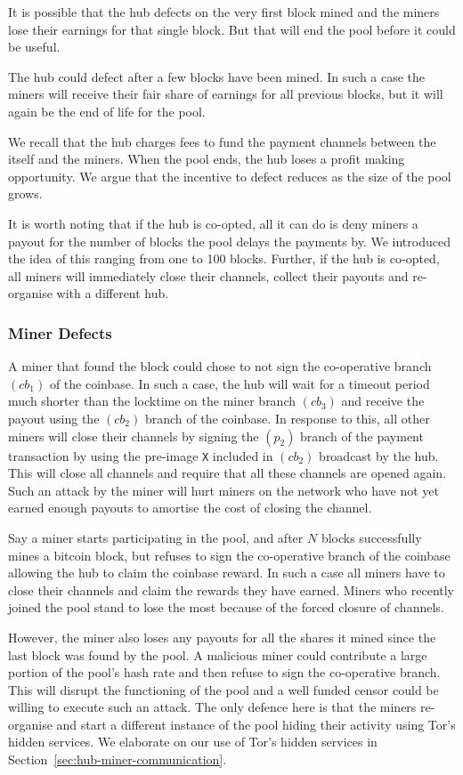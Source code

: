 \documentclass{article}
\begin{document}
It is possible that the hub defects on the very first block mined and
the miners lose their earnings for that single block. But that will
end the pool before it could be useful.

The hub could defect after a few blocks have been mined. In such a
case the miners will receive their fair share of earnings for all
previous blocks, but it will again be the end of life for the pool.

We recall that the hub charges fees to fund the payment channels
between the itself and the miners. When the pool ends, the hub loses a
profit making opportunity. We argue that the incentive to defect
reduces as the size of the pool grows.

It is worth noting that if the hub is co-opted, all it can do is deny
miners a payout for the number of blocks the pool delays the payments
by. We introduced the idea of this ranging from one to 100
blocks. Further, if the hub is co-opted, all miners will immediately
close their channels, collect their payouts and re-organise with a
different hub.

\subsubsection{Miner Defects}\label{ref:miner-defects}

A miner that found the block could chose to not sign the co-operative
branch $(cb_1)$ of the coinbase. In such a case, the hub will wait for
a timeout period much shorter than the locktime on the miner branch
$(cb_3)$ and receive the payout using the $(cb_2)$ branch of the
coinbase. In response to this, all other miners will close their
channels by signing the $(p_2)$ branch of the payment transaction by
using the pre-image \verb|X| included in $(cb_2)$ broadcast by the
hub. This will close all channels and require that all these channels
are opened again. Such an attack by the miner will hurt miners on the
network who have not yet earned enough payouts to amortise the cost of
closing the channel.

Say a miner starts participating in the pool, and after $N$ blocks
successfully mines a bitcoin block, but refuses to sign the
co-operative branch of the coinbase allowing the hub to claim the
coinbase reward. In such a case all miners have to close their
channels and claim the rewards they have earned. Miners who recently
joined the pool stand to lose the most because of the forced closure
of channels.

However, the miner also loses any payouts for all the shares it mined
since the last block was found by the pool. A malicious miner could
contribute a large portion of the pool's hash rate and then refuse to
sign the co-operative branch. This will disrupt the functioning of the
pool and a well funded censor could be willing to execute such an
attack. The only defence here is that the miners re-organise and start
a different instance of the pool hiding their activity using Tor's
hidden services. We elaborate on our use of Tor's hidden services in
Section~\ref{sec:hub-miner-communication}.
\end{document}
